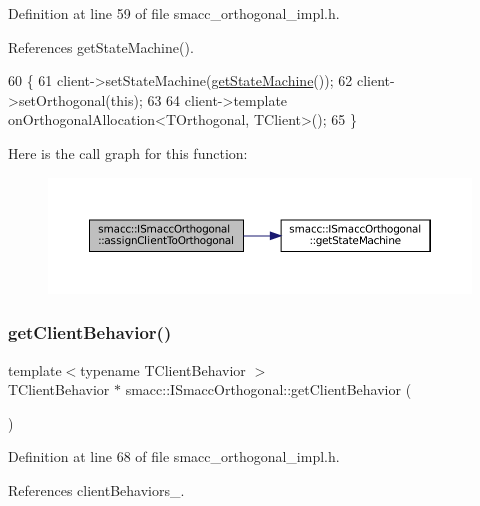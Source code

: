 Definition at line 59 of file smacc\+\_\+orthogonal\+\_\+impl.\+h.



References get\+State\+Machine().


\begin{DoxyCode}
60 \{
61     client->setStateMachine(\hyperlink{classsmacc_1_1ISmaccOrthogonal_aae265ec480b8ed552ddc79afd2d93a62}{getStateMachine}());
62     client->setOrthogonal(\textcolor{keyword}{this});
63 
64     client->template onOrthogonalAllocation<TOrthogonal, TClient>();
65 \}
\end{DoxyCode}
Here is the call graph for this function\+:
\nopagebreak
\begin{figure}[H]
\begin{center}
\leavevmode
\includegraphics[width=350pt]{classsmacc_1_1ISmaccOrthogonal_a2241e4d2018f5bd74bd1925f19791606_cgraph}
\end{center}
\end{figure}
\mbox{\label{classsmacc_1_1ISmaccOrthogonal_a463bb235217511954feb4133394c4c61}} 
\subsubsection{\texorpdfstring{get\+Client\+Behavior()}{getClientBehavior()}}
{\footnotesize\ttfamily template$<$typename T\+Client\+Behavior $>$ \\
T\+Client\+Behavior $\ast$ smacc\+::\+I\+Smacc\+Orthogonal\+::get\+Client\+Behavior (\begin{DoxyParamCaption}{ }\end{DoxyParamCaption})}



Definition at line 68 of file smacc\+\_\+orthogonal\+\_\+impl.\+h.



References client\+Behaviors\+\_\+.


